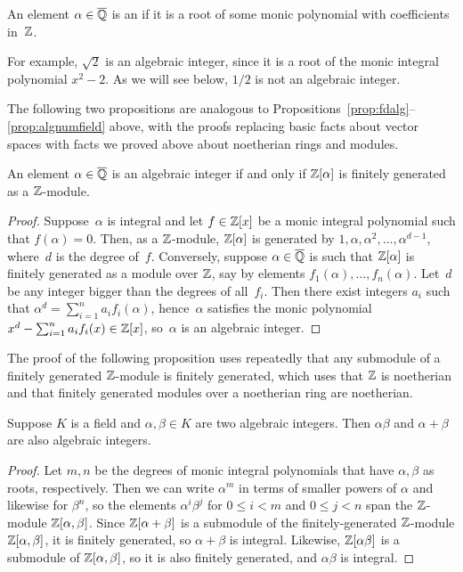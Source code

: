 \begin{definition}
An element $\alpha\in\overline{\mathbb{Q}}$ is an  if it is a
root of some monic polynomial with coefficients in~$\mathbb{Z}$.
\end{definition}
For example, $\sqrt{2}$ is an algebraic integer, since it is a root
of the monic integral polynomial $x^2-2$. As we will see below,
$1/2$ is not an algebraic integer.

The following two propositions are analogous to
Propositions~\ref{prop:fdalg}--\ref{prop:algnumfield} above, with
the proofs replacing basic facts about vector spaces with facts we
proved above about noetherian rings and modules.

\begin{proposition}\label{prop:intfg}
An element $\alpha\in\overline{\mathbb{Q}}$ is an algebraic integer if and only if $\mathbb{Z}[\alpha]$ is
finitely generated as a $\mathbb{Z}$-module.  
\end{proposition}
\begin{proof}
Suppose~$\alpha$ is integral and let $f\in\mathbb{Z}[x]$ be a monic integral polynomial
such that $f(\alpha)=0$.  Then, as a $\mathbb{Z}$-module, $\mathbb{Z}[\alpha]$
is generated by $1,\alpha,\alpha^2,\ldots,\alpha^{d-1}$, where~$d$ is
the degree of~$f$.   Conversely, suppose $\alpha\in\overline{\mathbb{Q}}$ is such that
$\mathbb{Z}[\alpha]$ is finitely generated as a module over $\mathbb{Z}$, say by elements 
$f_1(\alpha), \ldots, f_n(\alpha)$.  Let~$d$ be any integer bigger
than the degrees of all~$f_i$.  Then there exist integers $a_i$ such
that $\alpha^d = \sum_{i=1}^n a_i f_i(\alpha)$, hence~$\alpha$ satisfies
the monic polynomial $x^d - \sum_{i=1}^n a_i f_i(x) \in \mathbb{Z}[x]$, so~$\alpha$
is an algebraic integer.
\end{proof}

The proof of the following proposition uses repeatedly that any
submodule of a finitely generated $\mathbb{Z}$-module is finitely generated,
which uses that $\mathbb{Z}$ is noetherian and that finitely generated modules
over a noetherian ring are noetherian.
\begin{proposition}\label{prop:zbarring}
Suppose $K$ is a field and $\alpha, \beta\in K$ are two algebraic
integers.  Then $\alpha\beta$ and $\alpha+\beta$ are also algebraic integers.
\end{proposition}
\begin{proof}
Let $m, n$ be the degrees of monic integral polynomials that have
$\alpha, \beta$ as roots, respectively.  Then we can write $\alpha^m$
in terms of smaller powers of $\alpha$ and likewise for $\beta^n$, so 
the elements $\alpha^i\beta^j$ for $0\leq i < m$ and $0\leq j< n$ span
the $\mathbb{Z}$-module $\mathbb{Z}[\alpha, \beta]$.  Since $\mathbb{Z}[\alpha + \beta]$ is a submodule of the
finitely-generated $\mathbb{Z}$-module $\mathbb{Z}[\alpha, \beta]$, it is finitely
generated, so $\alpha+\beta$ is integral.  Likewise, $\mathbb{Z}[\alpha\beta]$
is a submodule of $\mathbb{Z}[\alpha, \beta]$, so it is also finitely
generated, and $\alpha\beta$ is integral.
\end{proof}



